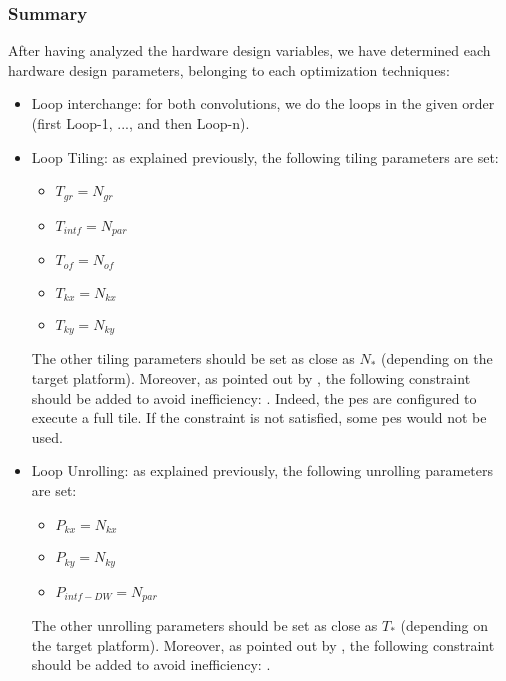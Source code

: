 \subsubsection{Summary}
%
After having analyzed the hardware design variables, we have determined each hardware design parameters, belonging to each optimization techniques:
\begin{itemize}
    \item Loop interchange: for both convolutions, we do the loops in the given order (first Loop-1, ..., and then Loop-n).
    \item Loop Tiling: as explained previously, the following tiling parameters are set:
    \begin{itemize}
        \item $T_{gr} = N_{gr}$
        \item $T_{intf} = N_{par}$
        \item $T_{of} = N_{of}$
        \item $T_{kx} = N_{kx}$
        \item $T_{ky} = N_{ky}$
    \end{itemize}
    The other tiling parameters should be set as close as $N_{*}$ (depending on the target platform). Moreover, as pointed out by \textcite{ma_optimizing_2018}, the following constraint should be added to avoid inefficiency: . Indeed, the \acrshort{pe}s are configured to execute a full tile. If the constraint is not satisfied, some \acrshort{pe}s would not be used.
    \item Loop Unrolling: as explained previously, the following unrolling parameters are set:
    \begin{itemize}
        \item $P_{kx} = N_{kx}$
        \item $P_{ky} = N_{ky}$
        \item $P_{intf-DW} = N_{par}$
    \end{itemize}
    The other unrolling parameters should be set as close as $T_{*}$ (depending on the target platform). Moreover, as pointed out by \textcite{ma_optimizing_2018}, the following constraint should be added to avoid inefficiency: .
\end{itemize}
